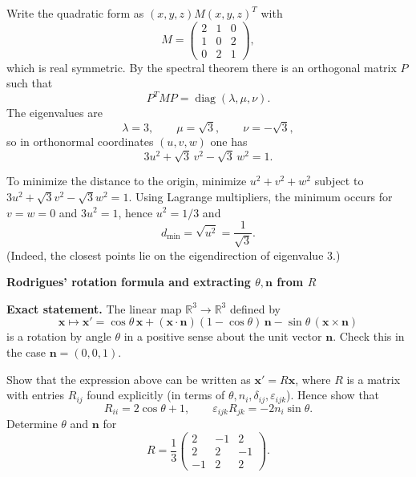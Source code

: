 \begin{solution}
Write the quadratic form as $(x,y,z)M(x,y,z)^T$ with
\[
M=\begin{pmatrix}
	2&1&0\\
	1&0&2\\
	0&2&1
\end{pmatrix},
\]
which is real symmetric. By the spectral theorem there is an orthogonal matrix $P$ such that
\[
P^T M P=\operatorname{diag}(\lambda,\mu,\nu).
\]
The eigenvalues are
\[
\lambda=3,\qquad \mu=\sqrt3,\qquad \nu=-\sqrt3,
\]
so in orthonormal coordinates $(u,v,w)$ one has
\[
3u^2+\sqrt3\,v^2-\sqrt3\,w^2=1.
\]

To minimize the distance to the origin, minimize $u^2+v^2+w^2$ subject to
$3u^2+\sqrt3 v^2-\sqrt3 w^2=1$. Using Lagrange multipliers,
the minimum occurs for $v=w=0$ and $3u^2=1$, hence $u^2=1/3$ and
\[
d_{\min}=\sqrt{u^2}=\frac1{\sqrt3}.
\]
(Indeed, the closest points lie on the eigendirection of eigenvalue $3$.)
\end{solution}

\begin{problem}[CP-I-0013]
\label{prob:cp-i-0013}
\textbf{Rodrigues' rotation formula and extracting $\theta,\mathbf n$ from $R$}

\textbf{Exact statement.}
\hspace*{1.5em}The linear map $\mathbb R^3\to\mathbb R^3$ defined by
\[
\mathbf x\mapsto \mathbf x'=\cos\theta\,\mathbf x+(\mathbf x\cdot\mathbf n)(1-\cos\theta)\,\mathbf n-\sin\theta\,(\mathbf x\times\mathbf n)
\]
is a rotation by angle $\theta$ in a positive sense about the unit vector $\mathbf n$.
Check this in the case $\mathbf n=(0,0,1)$.

Show that the expression above can be written as $\mathbf x'=R\mathbf x$, where $R$ is a matrix with entries $R_{ij}$ found explicitly (in terms of $\theta,n_i,\delta_{ij},\varepsilon_{ijk}$). Hence show that
\[
R_{ii}=2\cos\theta+1,\qquad \varepsilon_{ijk}R_{jk}=-2n_i\sin\theta.
\]
Determine $\theta$ and $\mathbf n$ for
\[
R=\frac13\begin{pmatrix}
	2&-1&2\\
	2&2&-1\\
	-1&2&2
\end{pmatrix}.
\]

\end{problem}

